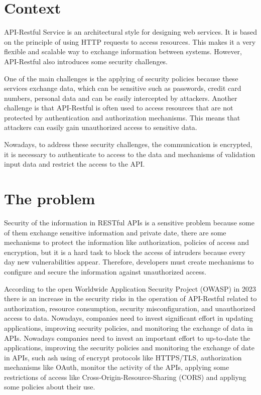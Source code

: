 \section{Context}

API-Restful Service is an architectural style for designing web services. It is based on the principle of using HTTP requests to access resources. This makes it a very flexible and scalable way to exchange information between systems. However, API-Restful also introduces some security challenges.

One of the main challenges is the applying of security policies because these services exchange data, which can be sensitive such as passwords, credit card numbers, personal data and can be easily intercepted by attackers. Another challenge is that API-Restful is often used to access resources that are not protected by authentication and authorization mechanisms. This means that attackers can easily gain unauthorized access to sensitive data.

Nowadays, to address these security challenges, the communication is encrypted, it is necessary to authenticate to access to the data and mechanisms of validation input data and restrict the access to the API.


\section{The problem}

Security of the information in RESTful APIs is a sensitive problem because some of them exchange sensitive information and private date, there are some mechanisms to protect the information like authorization, policies of access and encryption, but it is a hard task to block the access of intruders because every day new vulnerabilities appear.  Therefore, developers must create mechanisms to configure and secure the information against unauthorized access.

According to the open Worldwide Application Security Project (OWASP) in 2023 there is an increase in the security risks in the operation of API-Restful related to authorization, resource consumption, security misconfiguration, and unauthorized access to data. Nowadays, companies need to invest significant effort in updating applications, improving security policies, and monitoring the exchange of data in APIs. Nowadays companies need to invest an important effort to up-to-date the applications, improving the security policies and monitoring the exchange of date in APIs, such ash using of encrypt protocols like HTTPS/TLS, authorization mechanisms like OAuth, monitor the activity of the APIs, applying some restrictions of access like Cross-Origin-Resource-Sharing (CORS) and appliyng some policies about their use\cite{Riggs2023}.

